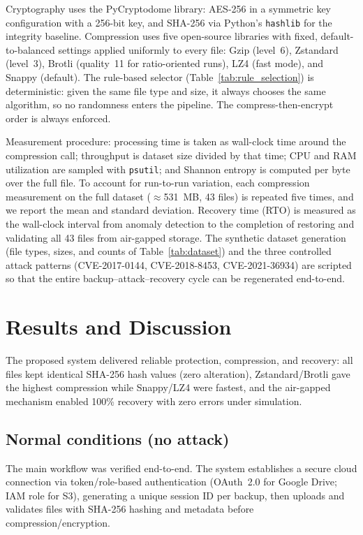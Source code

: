 \documentclass{iaesarticle}
\begin{document}
Cryptography uses the PyCryptodome library: AES-256 in a symmetric key configuration with a 256-bit key, and SHA-256 via Python's \texttt{hashlib} for the integrity baseline. Compression uses five open-source libraries with fixed, default-to-balanced settings applied uniformly to every file: Gzip (level~6), Zstandard (level~3), Brotli (quality~11 for ratio-oriented runs), LZ4 (fast mode), and Snappy (default). The rule-based selector (Table~\ref{tab:rule_selection}) is deterministic: given the same file type and size, it always chooses the same algorithm, so no randomness enters the pipeline. The compress-then-encrypt order is always enforced.

Measurement procedure: processing time is taken as wall-clock time around the compression call; throughput is dataset size divided by that time; CPU and RAM utilization are sampled with \texttt{psutil}; and Shannon entropy is computed per byte over the full file. To account for run-to-run variation, each compression measurement on the full dataset ($\approx$531~MB, 43 files) is repeated five times, and we report the mean and standard deviation. Recovery time (RTO) is measured as the wall-clock interval from anomaly detection to the completion of restoring and validating all 43 files from air-gapped storage. The synthetic dataset generation (file types, sizes, and counts of Table~\ref{tab:dataset}) and the three controlled attack patterns (CVE-2017-0144, CVE-2018-8453, CVE-2021-36934) are scripted so that the entire backup--attack--recovery cycle can be regenerated end-to-end.

\section{Results and Discussion}
\label{sec:results}
The proposed system delivered reliable protection, compression, and recovery: all files kept identical SHA-256 hash values (zero alteration), Zstandard/Brotli gave the highest compression while Snappy/LZ4 were fastest, and the air-gapped mechanism enabled 100\% recovery with zero errors under simulation.

\subsection{Normal conditions (no attack)}
The main workflow was verified end-to-end. The system establishes a secure cloud connection via token/role-based authentication (OAuth~2.0 for Google Drive; IAM role for S3), generating a unique session ID per backup, then uploads and validates files with SHA-256 hashing and metadata before compression/encryption.
\end{document}
